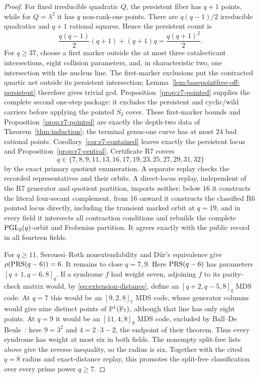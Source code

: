 \begin{proof}
For fixed irreducible quadratic \(Q\), the persistent fiber has
\(q+1\) points, while for \(Q=\lambda^2\) it has \(q\) non-rank-one
points.  There are \(q(q-1)/2\) irreducible quadratics and \(q+1\)
rational squares.  Hence the persistent count is
\[
 \frac{q(q-1)}2(q+1)+(q+1)q=\frac{q(q+1)^2}{2}.
\]
For \(q\geq37\), choose a first marker outside the at most three
catalecticant intersections, eight collision parameters, and, in
characteristic two, one intersection with the nucleus line.  The first-marker
exclusions put the contracted quartic net outside its persistent intersection;
Lemma~\ref{lem:basepointfree-off-persistent} therefore gives trivial gcd.
Proposition~\ref{prop:r7-pointed} supplies the complete second one-step
package: it excludes the persistent and cyclic/wild carriers before applying
the pointed \(S_3\) cover.
These first-marker bounds and Proposition~\ref{prop:r7-pointed} are
exactly the depth-two data of Theorem~\ref{thm:induction}; the terminal
genus-one curve has at most \(24\) bad rational points.
Corollary~\ref{cor:r7-contained} leaves exactly the persistent locus and
Proposition~\ref{prop:r7-central}.  Certificate R7 covers
\[
q\in\{7,8,9,11,13,16,17,19,23,25,27,29,31,32\}
\]
by the exact primary quotient enumeration.  A separate replay checks the
recorded representatives and their orbits.  A direct-locus replay, independent
of the R7 generator and quotient partition, imports neither: below \(16\) it
constructs the literal four-secant complement, from \(16\) onward it
constructs the classified R6 pointed locus directly, including the
transient marked orbit at \(q=19\), and in every field it intersects all
contraction conditions and rebuilds the complete
\(\operatorname{PGL}_2(q)\)-orbit and Frobenius partition.  It agrees exactly with the
public record in all fourteen fields.

For \(q\geq11\), Seroussi--Roth nonextendability and Dür's equivalence give
\(\rho(\operatorname{PRS}(q-6))=6\).  It remains to close \(q=7,9\).  Here
\(\operatorname{PRS}(q-6)\) has parameters \([q+1,q-6,8]_q\).  If a syndrome \(f\)
had weight seven, adjoining \(f\) to its parity-check matrix would, by
\eqref{eq:extension-distance}, define an
\([q+2,q-5,8]_q\) MDS code.  At \(q=7\) this would be an
\([9,2,8]_7\) MDS code, whose generator columns would give nine distinct
points of \(\mathbb P^1(\mathbb F_7)\), although that line has only eight points.  At \(q=9\)
it would be an \([11,4,8]_9\) MDS code, excluded by
Ball--De Beule~\cite[Thm.~5.2]{BallDeBeule2012}: here
\(9=3^2\) and \(4=2\cdot3-2\), the endpoint of their theorem.
Thus every syndrome has weight at most six in both fields.  The nonempty
split-free lists above give the reverse inequality, so the radius is six.
Together with the cited \(q=8\) radius and exact-distance replay, this promotes
the split-free classification over every prime power \(q\geq7\).
\end{proof}

